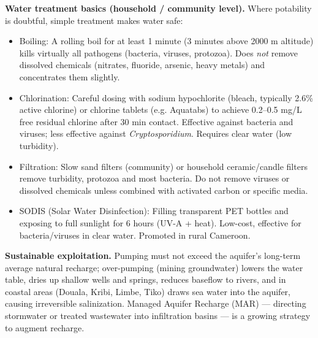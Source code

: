 \documentclass[11pt]{article}
\newcommand{\cle}[1]{{\popxbold\color{popdark}#1}}
\begin{document}
\textbf{Water treatment basics (household / community level).} Where potability is doubtful, simple treatment makes water safe:
\begin{itemize}
\item \cle{Boiling}: A rolling boil for at least 1 minute (3 minutes above 2000 m altitude) kills virtually all pathogens (bacteria, viruses, protozoa). Does \emph{not} remove dissolved chemicals (nitrates, fluoride, arsenic, heavy metals) and concentrates them slightly.
\item \cle{Chlorination}: Careful dosing with sodium hypochlorite (bleach, typically 2.6\% active chlorine) or chlorine tablets (e.g. Aquatabs) to achieve 0.2--0.5 mg/L free residual chlorine after 30 min contact. Effective against bacteria and viruses; less effective against \emph{Cryptosporidium}. Requires clear water (low turbidity).
\item \cle{Filtration}: Slow sand filters (community) or household ceramic/candle filters remove turbidity, protozoa and most bacteria. Do not remove viruses or dissolved chemicals unless combined with activated carbon or specific media.
\item \cle{SODIS (Solar Water Disinfection)}: Filling transparent PET bottles and exposing to full sunlight for 6 hours (UV-A + heat). Low-cost, effective for bacteria/viruses in clear water. Promoted in rural Cameroon.
\end{itemize}

\textbf{Sustainable exploitation.} Pumping must not exceed the aquifer's long-term average natural recharge; over-pumping (mining groundwater) lowers the water table, dries up shallow wells and springs, reduces baseflow to rivers, and in coastal areas (Douala, Kribi, Limbe, Tiko) draws sea water into the aquifer, causing irreversible salinization. Managed Aquifer Recharge (MAR) — directing stormwater or treated wastewater into infiltration basins — is a growing strategy to augment recharge.
\end{document}
